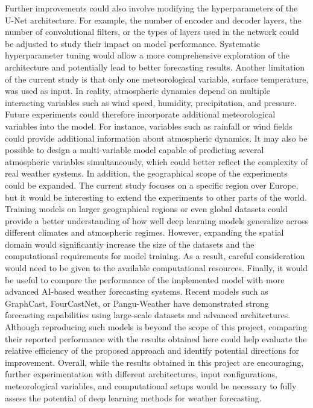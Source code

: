 Further improvements could also involve modifying the hyperparameters of the U-Net architecture. For example, the number of encoder and decoder layers, the number of convolutional filters, or the types of layers used in the network could be adjusted to study their impact on model performance. Systematic hyperparameter tuning would allow a more comprehensive exploration of the architecture and potentially lead to better forecasting results.
Another limitation of the current study is that only one meteorological variable, surface temperature, was used as input. In reality, atmospheric dynamics depend on multiple interacting variables such as wind speed, humidity, precipitation, and pressure. Future experiments could therefore incorporate additional meteorological variables into the model. For instance, variables such as rainfall or wind fields could provide additional information about atmospheric dynamics. It may also be possible to design a multi-variable model capable of predicting several atmospheric variables simultaneously, which could better reflect the complexity of real weather systems.
In addition, the geographical scope of the experiments could be expanded. The current study focuses on a specific region over Europe, but it would be interesting to extend the experiments to other parts of the world. Training models on larger geographical regions or even global datasets could provide a better understanding of how well deep learning models generalize across different climates and atmospheric regimes. However, expanding the spatial domain would significantly increase the size of the datasets and the computational requirements for model training. As a result, careful consideration would need to be given to the available computational resources.
Finally, it would be useful to compare the performance of the implemented model with more advanced AI-based weather forecasting systems. Recent models such as GraphCast, FourCastNet, or Pangu-Weather have demonstrated strong forecasting capabilities using large-scale datasets and advanced architectures. Although reproducing such models is beyond the scope of this project, comparing their reported performance with the results obtained here could help evaluate the relative efficiency of the proposed approach and identify potential directions for improvement.
Overall, while the results obtained in this project are encouraging, further experimentation with different architectures, input configurations, meteorological variables, and computational setups would be necessary to fully assess the potential of deep learning methods for weather forecasting.
